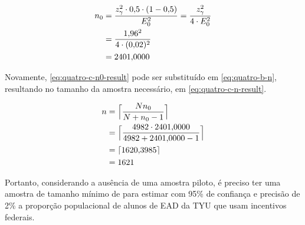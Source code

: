 	\begin{align}
		n_0 &= \label{eq:quatro-c-n0-expr}
			   \frac{z_\gamma^2 \cdot \num{0.5} \cdot (1 - \num{0.5})}{E_0^2} = \frac{z_\gamma^2}{4 \cdot E_0^2} \\
			&= \frac{\num{1.96}^2}{4 \cdot (\num{0.02})^2} \nonumber \\
			&= \label{eq:quatro-c-n0-result}
			   \num{2401.0000}
	\end{align}

	Novamente, \eqref{eq:quatro-c-n0-result} pode ser substituído em
	\eqref{eq:quatro-b-n}, resultando no tamanho da amostra necessário, em
	\eqref{eq:quatro-c-n-result}.

	\begin{align}
		n &= \Big\lceil \frac{N n_0}{N + n_0 - 1} \nonumber \Big\rceil \\
		  &= \Big\lceil \frac{4982 \cdot \num{2401.0000}}{4982 + \num{2401.0000} -1} \nonumber \Big\rceil \\
		  &= \lceil \num{1620.3985} \nonumber \rceil \\
		  &= \label{eq:quatro-c-n-result} 
			 1621
	\end{align}

	Portanto, considerando a ausência de uma amostra piloto, é preciso ter
	uma amostra de tamanho mínimo de \QUATROCnceil para estimar com 95\% de
	confiança e precisão de 2\% a proporção populacional de alunos de EAD da
	TYU que usam incentivos federais.
